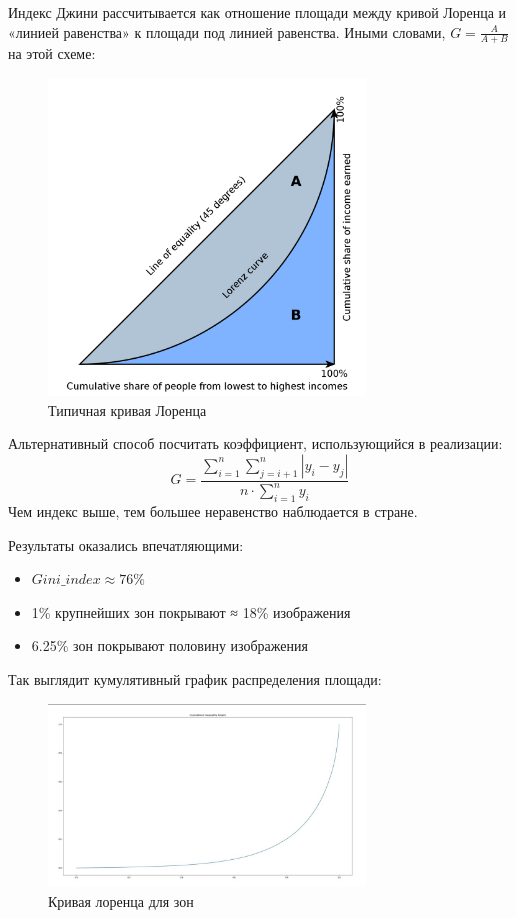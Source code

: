 \documentclass[11pt]{article}
\begin{document}
    Индекс Джини рассчитывается как отношение площади между кривой Лоренца и «линией равенства» к площади под линией равенства.
    Иными словами, $G = \frac{A}{A + B}$ на этой схеме:

    \begin{figure}\label{fig:lorenz_curve}
        \centering
        \includegraphics[width=0.75\textwidth]{../images/typical_lorenz_curve.png}
        \caption{Типичная кривая Лоренца}
    \end{figure}
    Альтернативный способ посчитать коэффициент, использующийся в реализации:
    \begin{equation}
        G = \frac{\sum_{i=1}^{n}  \sum_{j=i+1}^{n}  \left| y_i - y_j \right|}{n \cdot \sum_{i=1}^{n} y_i}
    \end{equation}
    Чем индекс выше, тем большее неравенство наблюдается в стране.


    Результаты оказались впечатляющими:
    \begin{itemize}
        \item $Gini\_index \approx 76\%$
        \item 1\% крупнейших зон покрывают ≈ 18\% изображения
        \item 6.25\% зон покрывают половину изображения
    \end{itemize}

    Так выглядит кумулятивный график распределения площади:
    \begin{figure}\label{fig:cumulative_inequality_graph}
        \centering
        \includegraphics[width=0.75\textwidth]{../images/cumulative_inequality_graph.jpg}
        \caption{Кривая лоренца для зон}
    \end{figure}
\end{document}
